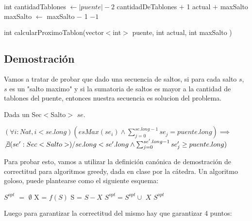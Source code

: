 \begin{algorithm}
\begin{algorithmic}
\STATE int cantidadTablones $\gets |puente| - 2$
        \RETURN cantidadDeTablones $+$ 1
    \ENDIF
        \RETURN actual $+$ maxSalto
    \ENDIF
    \STATE maxSalto $\gets$ maxSalto $-$ 1
\ENDWHILE
\RETURN $-1$
\caption{int calcularProximoTablon(vector$<$int$>$ puente, int actual, int maxSalto )}%
\end{algorithmic}
\end{algorithm}
\subsection{Demostraci\'on}

Vamos a tratar de probar que dado una secuencia de saltos, si para cada salto $s$, $s$ es un "salto maximo" y si la sumatoria de saltos es mayor a la cantidad de tablones del puente, entonces nuestra secuencia es solucion del problema.

Dada un Sec$<$Salto$>$ $se$.

$(\forall i:Nat, i < se.long)(esMax(se_{i}) \wedge \sum_{j=0}^{se.long-1}se_{j} = puente.long)\implies$ \\ $\not\exists (se':Sec<Salto>) /
se.long < se'.long \wedge \sum_{j=0}^{se'.long-1}se'_{j} \geq puente.long)$  

Para probar esto, vamos a utilizar la definici\'on can\'onica de demostraci\'on de correctitud para algoritmos greedy, dada en clase por la c\'atedra. Un algoritmo goloso, puede plantearse como el siguiente esquema:

\begin{algorithm}
\begin{algorithmic}
\STATE $S^{opt}$ $=$ $\emptyset$
    \STATE X = $f(S)$
    \STATE S = $S - {X}$
    \STATE $S^{opt} = S^{opt} \cup$ ${X}$   
    \ENDIF         
\ENDWHILE
\RETURN $S^{opt}$
\end{algorithmic}
\end{algorithm}

Luego para garantizar la correctitud del mismo hay que garantizar 4 puntos:

